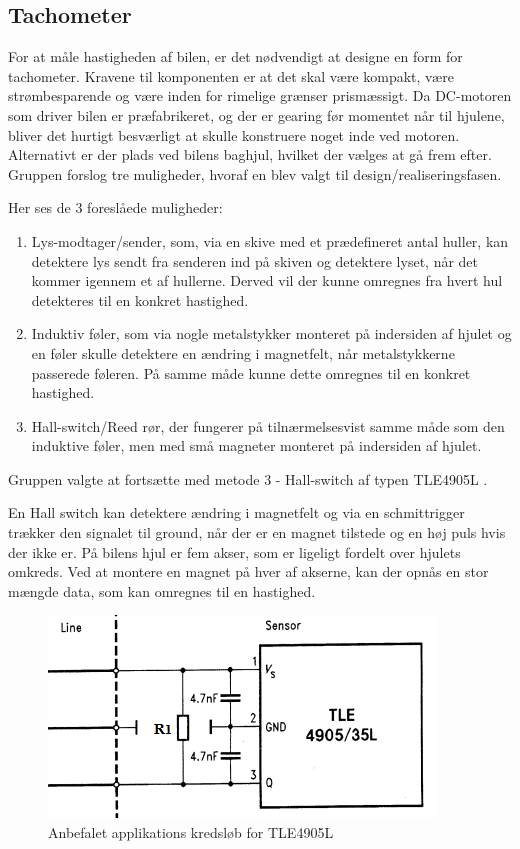 \subsection{Tachometer} \label{sub:systemarkitektur_tachometer}

For at måle hastigheden af bilen, er det nødvendigt at designe en form for tachometer. Kravene til komponenten er at det skal være kompakt, være strømbesparende og være inden for rimelige grænser prismæssigt. Da DC-motoren som driver bilen er præfabrikeret, og der er gearing før momentet når til hjulene, bliver det hurtigt besværligt at skulle konstruere noget inde ved motoren. Alternativt er der plads ved bilens baghjul, hvilket der vælges at gå frem efter. Gruppen forslog tre muligheder, hvoraf en blev valgt til design/realiseringsfasen.

Her ses de 3 foreslåede muligheder:

\begin{enumerate}
	\item Lys-modtager/sender, som, via en skive med et prædefineret antal huller, kan detektere lys sendt fra senderen ind på skiven og detektere lyset, når det kommer igennem et af hullerne. Derved vil der kunne omregnes fra hvert hul detekteres til en konkret hastighed.
	\item Induktiv føler, som via nogle metalstykker monteret på indersiden af hjulet og en føler skulle detektere en ændring i magnetfelt, når metalstykkerne passerede føleren. På samme måde kunne dette omregnes til en konkret hastighed.
	\item Hall-switch/Reed rør, der fungerer på tilnærmelsesvist samme måde som den induktive føler, men med små magneter monteret på indersiden af hjulet. 
\end{enumerate}

Gruppen valgte at fortsætte med metode 3 - Hall-switch af typen TLE4905L \cite{lib:TLE4905L}. 

En Hall switch kan detektere ændring i magnetfelt og via en schmittrigger trækker den signalet til ground, når der er en magnet tilstede og en høj puls hvis der ikke er. På bilens hjul er fem akser, som er ligeligt fordelt over hjulets omkreds. Ved at montere en magnet på hver af akserne, kan der opnås en stor mængde data, som kan omregnes til en hastighed. 

\begin{figure}[h]
\centering
\includegraphics[scale=1]{../fig/billeder/tle4905L_application_circuit.png}
\caption{Anbefalet applikations kredsløb for TLE4905L}
\label{fig:tle4905L_app_circuit}
\end{figure}

